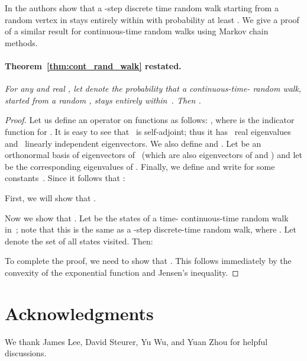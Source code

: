 \documentclass[11pt]{article}
\begin{document}
In \cite{OT12} the authors show that a -step discrete time random walk starting from a random vertex in  stays entirely within  with probability at least .  We give a proof of a similar result for continuous-time random walks using Markov chain methods.

\paragraph{Theorem~\ref{thm:cont_rand_walk} restated.} \emph{For any  and real , let  denote the probability that a continuous-time- random walk, started from a random , stays entirely within~.  Then .}

\begin{proof}
Let us define an operator  on functions  as follows:  , where  is the indicator function for .  It is easy to see that~ is self-adjoint; thus it has~ real eigenvalues and~ linearly independent eigenvectors.  We also define  and .  Let  be an orthonormal basis of eigenvectors of~ (which are also eigenvectors of  and ) and let  be the corresponding eigenvalues of . Finally, we define  and write  for some constants~.  Since  it follows that :

First, we will show that .


Now we show that .  Let  be the states of a time- continuous-time random walk in~; note that this is the same as a -step discrete-time random walk, where .  Let  denote the set of all states visited.  Then:


To complete the proof, we need to show that .  This follows immediately by the convexity of the exponential function and Jensen's inequality.
\ignore{

\qedhere
}
\end{proof}


\section*{Acknowledgments}
We thank James Lee, David Steurer, Yu Wu, and Yuan Zhou for helpful discussions.




\end{document}
